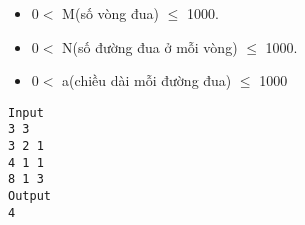 \begin{itemize}
	\item     0$<$ M(số vòng đua)  $\le$ 1000.   
	\item     0$<$ N(số đường đua ở mỗi vòng) $\le$ 1000.   
	\item     0$<$ a(chiều dài mỗi đường đua) $\le$ 1000   
\end{itemize}
\begin{verbatim}
Input
3 3
3 2 1
4 1 1
8 1 3
Output
4
\end{verbatim}